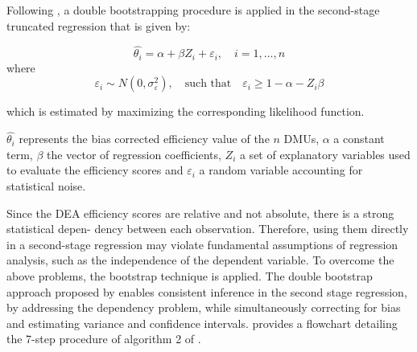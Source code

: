Following \cite{simar2007}, a double bootstrapping procedure is applied in the second-stage
truncated regression that is given by:
\vspace{-0.3cm}

\begin{equation}
\label{eq:regression}
\hat{\theta_i}=\alpha+\beta Z_i + \varepsilon_i, \quad i=1,\ldots,n   
\end{equation}
\vspace{-0.1cm}
where
\vspace{-0.1cm}
\begin{equation}
\label{eq:noise}
\varepsilon_i \sim N(0, \sigma_\varepsilon^2), \quad \text{such that} \quad \varepsilon_i \geq 1 - \alpha - Z_i \beta
\end{equation}
\vspace{-0.6cm}

which is estimated by maximizing the corresponding likelihood function.

$\hat{\theta_i}$ represents the bias corrected efficiency value of the $n$ DMUs, $\alpha$ a constant term, $\beta$ the vector of
regression coefficients, $Z_i$ a set of explanatory variables used to evaluate the efficiency scores and $\varepsilon_i$ a
random variable accounting for statistical noise. 

Since the DEA efficiency scores are relative and not absolute, there is a strong statistical depen-
dency between each observation. Therefore, using them directly in a second-stage regression may
violate fundamental assumptions of regression analysis, such as the independence of the dependent
variable. To overcome the above problems, the bootstrap technique is applied. The double bootstrap approach proposed
by \cite{simar2007} enables consistent inference in the second stage regression, by addressing
the dependency problem, while simultaneously correcting for bias and estimating variance and confidence intervals.   provides a flowchart detailing the 7-step procedure of algorithm 2 of \cite{simar2007}.


